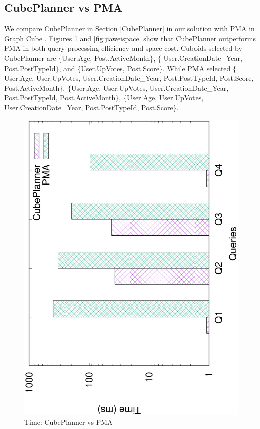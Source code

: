 	\subsection{CubePlanner vs PMA}
	\label{CubePlannerPMA}
	We compare CubePlanner in Section \ref{CubePlanner} in our solution with PMA in Graph Cube \cite{DBLP:conf/sigmod/ZhaoLXH11}. Figures \ref{fig:qjiawei} and \ref{fig:jiaweispace} show that CubePlanner outperforms PMA in both query processing efficiency and space cost. Cuboids selected by CubePlanner are $\{$User.Age, Post.ActiveMonth$\}$, $\{$ User.CreationDate\_Year, Post.PostTypeId$\}$, and $\{$User.UpVotes, Post.Score$\}$. While PMA selected $\{$User.Age, User.UpVotes, User.CreationDate\_Year, Post.PostTypeId, Post.Score, Post.ActiveMonth$\}$, $\{$User.Age, User.UpVotes, User.CreationDate\_Year, Post.PostTypeId, Post.ActiveMonth$\}$, $\{$User.Age, User.UpVotes, User.CreationDate\_Year, Post.PostTypeId, Post.Score$\}$.


\begin{figure}[H]
	\centering
	\includegraphics[scale=0.43, angle=270]{plot/qjiawei.eps}
	\caption{Time: CubePlanner vs PMA}
	\label{fig:qjiawei}
\end{figure}

